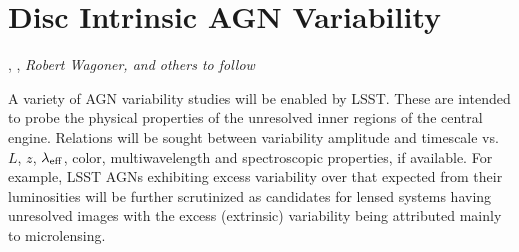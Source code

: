 %
%
%
%
%
%
%

\section{Disc Intrinsic AGN Variability}
\def\secname{\chpname:variability}\label{sec:\secname}

,
,
{\it Robert Wagoner, and others to follow}



A variety of AGN variability studies will be enabled by LSST. These are
intended to probe the physical properties of the unresolved inner regions
of the central engine. Relations will be sought between variability amplitude
and timescale vs. $L$, $z$, $\lambda_{\rm eff}$, color, multiwavelength and
spectroscopic properties, if available. For example, LSST AGNs exhibiting excess
variability over that expected from their luminosities will be further scrutinized
as candidates for lensed systems having unresolved images with the excess
(extrinsic) variability being attributed mainly to microlensing.

